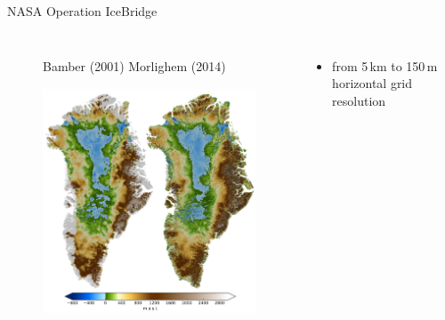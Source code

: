 \documentclass[hide notes,intlimits]{beamer}
\begin{document}
\begin{frame}{NASA Operation IceBridge}
  \begin{columns}
    \column[c]{8cm}
    \begin{figure}
      \small{Bamber (2001) \hspace{4em} Morlighem (2014)}
      \includegraphics[height=7.5cm]{greenland_bed}
    \end{figure}
    \column[c]{4cm}
    \begin{itemize}
    \item from 5\,km to 150\,m horizontal grid resolution
    \end{itemize}
  \end{columns}
\end{frame}
\end{document}
